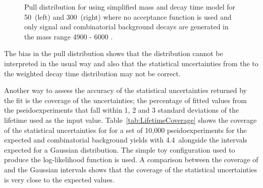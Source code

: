 \begin{figure}[htbp]
\begin{subfigure}[b]{0.48\textwidth}
   \end{subfigure}
    \caption{Pull distribution for \tmumu using simplified mass and decay time model for 50~\fb (left) and 300~\fb (right) where no acceptance function is used and only signal and combinatorial background decays are generated in the mass range 4900 - 6000 \mevcc.}
    \label{fig:morestatstaupulls}
\end{figure}


The bias in the \tmumu pull distribution shows that the distribution cannot be interpreted in the usual way and also that the statistical uncertainties from the \ml to the weighted decay time distribution may not be correct. 

Another way to assess the accuracy of the statistical uncertainties returned by the \ml fit is the coverage of the uncertainties; the percentage of fitted \tmumu values from the pseidoexperiments that fall within 1, 2 and 3 standard deviations of the lifetime used as the input value. Table~\ref{tab:LifetimeCoverage} shows the coverage of the statistical uncertainties for \tmumu for a set of 10,000 pseidoexperiments for the expected \bsmumu and combinatorial background yields with 4.4~\fb alongside the intervals expected for a Gaussian distribution. The simple toy configuration used to produce the log-likelihood function is used. A comparison between the coverage of \tmumu and the Gaussian intervals shows that the coverage of the statistical uncertainties is very close to the expected values.

